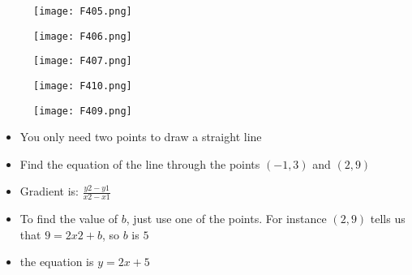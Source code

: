 \begin{frame}
  \begin{figure}
    \centering
    \texttt{[image: F405.png]} %
  \end{figure}
\end{frame}
\begin{frame}
  \begin{figure}
    \centering
    \texttt{[image: F406.png]} %
  \end{figure}
\end{frame}
\begin{frame}
  \begin{figure}
    \centering
    \texttt{[image: F407.png]} %
  \end{figure}
\end{frame}
\begin{frame}
  \begin{figure}
    \centering
    \texttt{[image: F410.png]} %
  \end{figure}
\end{frame}
\begin{frame}
  \begin{figure}
    \centering
    \texttt{[image: F409.png]} %
  \end{figure}
\end{frame}
\begin{frame}
\begin{itemize}
   \item You only need two points to draw a straight line
   \item Find the equation of the line through the points $(-1,3)$ and $(2,9)$

   \item Gradient  is: $\frac{y2 - y1}{x2 - x1} $%

   \item To find the value of $b$, just use one of the points. For instance $(2,9)$ tells us that $9 = 2 x 2 + b$, so $b$ is $5$
   \item the equation is $y = 2x + 5$
\end{itemize}
\end{frame}
